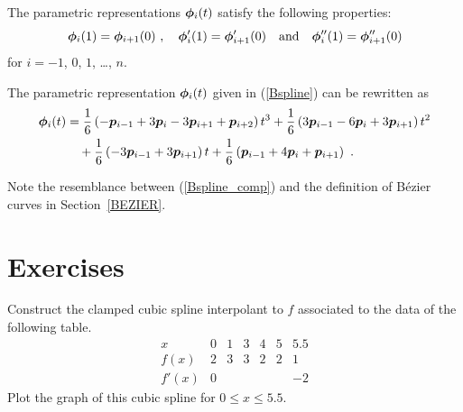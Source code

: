 The parametric representations $\bm{\phi}_i(t)$ satisfy the following
properties:
\[
\bm{\phi}_i(1) = \bm{\phi}_{i+1}(0) \ ,\quad
\bm{\phi}'_i(1) = \bm{\phi}'_{i+1}(0) \quad
\text{and} \quad
\bm{\phi}''_i(1) = \bm{\phi}''_{i+1}(0)
\]
for $i=-1$, $0$, $1$, \ldots, $n$.

The parametric representation $\bm{\phi}_i(t)$ given in (\ref{Bspline})
can be rewritten as
\begin{align}
\VEC{\phi}_i(t) &= \frac{1}{6} \left(-\VEC{p}_{i-1} + 3 \VEC{p}_i
- 3 \VEC{p}_{i+1} + \VEC{p}_{i+2} \right) t^3
+ \frac{1}{6} \left(3 \VEC{p}_{i-1} - 6 \VEC{p}_i
+ 3 \VEC{p}_{i+1} \right) t^2
\nonumber \\
&\quad + \frac{1}{6} \left(-3 \VEC{p}_{i-1} + 3 \VEC{p}_{i+1} \right) t
+ \frac{1}{6} \left(\VEC{p}_{i-1} + 4 \VEC{p}_i + \VEC{p}_{i+1} \right)\ .
\label{Bspline_comp}
\end{align}

Note the resemblance between (\ref{Bspline_comp}) and the definition
of Bézier curves in Section~\ref{BEZIER}.

\section{Exercises}

\begin{question}
Construct the clamped cubic spline interpolant to $f$ associated to
the data of the following table.
\[
\begin{array}{c|cccccc}
x & 0 & 1 & 3 & 4 & 5 & 5.5 \\
\hline
f(x) & 2 & 3 & 3 & 2 & 2 & 1 \\
f'(x) & 0 & & & & & -2 
\end{array}
\]
Plot the graph of this cubic spline for $0 \leq x \leq 5.5$.
\end{question}


